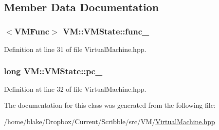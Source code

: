 \subsection{Member Data Documentation}
\hypertarget{class_v_m_1_1_v_m_state_a2ff18b30485d687b3a33815a70b76914}{
\subsubsection[{func\-\_\-}]{$<${\bf V\-M\-Func}$>$ V\-M\-::\-V\-M\-State\-::func\-\_\-}}\label{class_v_m_1_1_v_m_state_a2ff18b30485d687b3a33815a70b76914}


Definition at line 31 of file Virtual\-Machine.\-hpp.

\hypertarget{class_v_m_1_1_v_m_state_a07129fa10e4c131b28dacf7ee3aee917}{
\subsubsection[{pc\-\_\-}]{\setlength{\rightskip}{0pt plus 5cm}long V\-M\-::\-V\-M\-State\-::pc\-\_\-}}\label{class_v_m_1_1_v_m_state_a07129fa10e4c131b28dacf7ee3aee917}


Definition at line 32 of file Virtual\-Machine.\-hpp.



The documentation for this class was generated from the following file\-:\begin{DoxyCompactItemize}
\item 
/home/blake/\-Dropbox/\-Current/\-Scribble/src/\-V\-M/\hyperlink{_virtual_machine_8hpp}{Virtual\-Machine.\-hpp}\end{DoxyCompactItemize}
